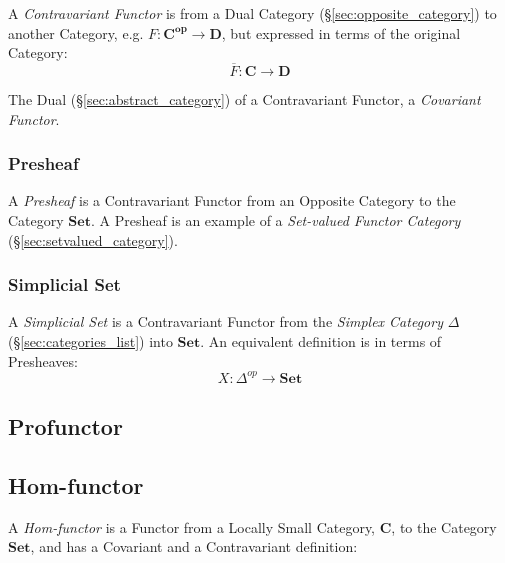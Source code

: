 A \emph{Contravariant Functor} is from a Dual Category
(\S\ref{sec:opposite_category}) to another Category, e.g. $F :
\mathbf{C^{op}} \rightarrow \mathbf{D}$, but expressed in terms of the
original Category:
\[
    \overline{F} : \mathbf{C} \rightarrow \mathbf{D}
\]

The Dual (\S\ref{sec:abstract_category}) of a Contravariant
Functor, a \emph{Covariant Functor}.



\subsubsection{Presheaf}\label{sec:presheaf}

A \emph{Presheaf} is a Contravariant Functor from an Opposite Category
to the Category $\mathbf{Set}$. A Presheaf is an example of a
\emph{Set-valued Functor Category}
(\S\ref{sec:setvalued_category}).



\subsubsection{Simplicial Set}\label{sec:simplicial_set}

A \emph{Simplicial Set} is a Contravariant Functor from the
\emph{Simplex Category} $\Delta$ (\S\ref{sec:categories_list}) into
$\mathbf{Set}$. An equivalent definition is in terms of Presheaves:
\[
    X: \Delta^{op} \rightarrow \mathbf{Set}
\]


\subsection{Profunctor}\label{sec:profunctor}



\subsection{Hom-functor}\label{sec:hom_functor}

A \emph{Hom-functor} is a Functor from a Locally Small Category,
$\mathbf{C}$, to the Category $\mathbf{Set}$, and has a Covariant and
a Contravariant definition:

